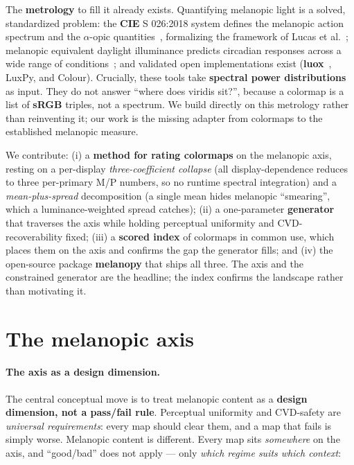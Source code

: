 \documentclass[10pt,a4paper,twocolumn]{article}
\begin{document}
\par
The \textbf{metrology} to fill it already exists.
Quantifying melanopic light is a solved, standardized problem: the \textbf{CIE} S 026:2018 system defines the melanopic action spectrum and the $\alpha$-opic quantities~\cite{cie_s026_2018}, formalizing the framework of Lucas et al.~\cite{lucas2014melanopsin}; melanopic equivalent daylight illuminance predicts circadian responses across a wide range of conditions~\cite{brown2020melanopic}; and validated open implementations exist (\textbf{luox}~\cite{spitschan2021luox}, LuxPy, and Colour).
Crucially, these tools take \textbf{spectral power distributions} as input.
They do not answer ``where does viridis sit?'', because a colormap is a list of \textbf{sRGB} triples, not a spectrum. %
We build directly on this metrology rather than reinventing it; our work is the missing adapter from colormaps to the established melanopic measure.

\par
We contribute: (i) a \textbf{method for rating colormaps} on the melanopic axis, resting on a per-display \emph{three-coefficient collapse} (all display-dependence reduces to three per-primary M/P numbers, so no runtime spectral integration) and a \emph{mean-plus-spread} decomposition (a single mean hides melanopic ``smearing'', which a luminance-weighted spread catches); (ii) a one-parameter \textbf{generator} that traverses the axis while holding perceptual uniformity and CVD-recoverability fixed; (iii) a \textbf{scored index} of colormaps in common use, which places them on the axis and confirms the gap the generator fills; and (iv) the open-source package \textbf{melanopy} that ships all three.
The axis and the constrained generator are the headline; the index confirms the landscape rather than motivating it.

\section{The melanopic axis}\label{sec:axis}

\paragraph{The axis as a design dimension.}
The central conceptual move is to treat melanopic content as a \textbf{design dimension, not a pass/fail rule}.
Perceptual uniformity and CVD-safety are \emph{universal requirements}: every map should clear them, and a map that fails is simply worse.
Melanopic content is different. Every map sits \emph{somewhere} on the axis, and ``good/bad'' does not apply --- only \emph{which regime suits which context}:
\end{document}
